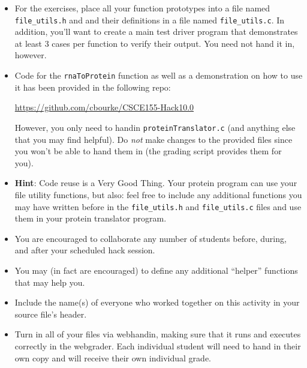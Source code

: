 \documentclass[12pt]{scrartcl}
\begin{document}
\begin{itemize}

  \item For the exercises, place all your function prototypes into a file 
  named \texttt{file_utils.h} and and their definitions in a
  file named \texttt{file_utils.c}.  In addition, you'll want
  to create a main test driver program that demonstrates at least 3 cases 
  per function to verify their output.  You need not hand it in, however.
  
  \item Code for the \texttt{rnaToProtein} function as well as 
  a demonstration on how to use it has been provided in the following repo:

  \url{https://github.com/cbourke/CSCE155-Hack10.0}

  However, you only need to handin \texttt{proteinTranslator.c}
  (and anything else that you may find helpful).  Do \emph{not} make changes
  to the provided files since you won't be able to hand them in (the grading
  script provides them for you).
  
  \item \textbf{Hint}: Code reuse is a Very Good Thing.  Your protein program
  can use your file utility functions, but also: feel free to include
  any additional functions you may have written before in the 
  \texttt{file_utils.h} and \texttt{file_utils.c} files
  and use them in your protein translator program.

  \item You are encouraged to collaborate any number of students 
  before, during, and after your scheduled hack session.  

  \item You may (in fact are encouraged) to define any additional
  ``helper'' functions that may help you.

  \item Include the name(s) of everyone who worked together on
  this activity in your source file's header.

  \item Turn in all of your files via webhandin, making sure that 
  it runs and executes correctly in the webgrader.  Each individual 
  student will need to hand in their own copy and will receive 
  their own individual grade.
\end{itemize}  
\end{document}
